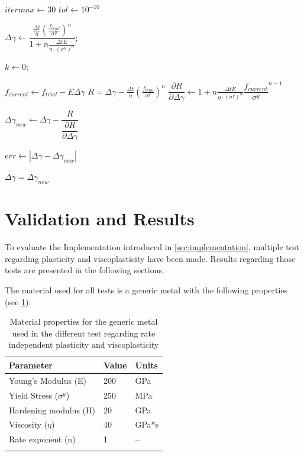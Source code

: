 \documentclass[final,5p,times,twocolumn]{elsarticle}
\begin{document}
\begin{algorithm}
  \KwOut{$\Delta \gamma$}

    $itermax \gets 30$\;
    $tol \gets 10^{-10}$\;

    $\Delta \gamma \gets \dfrac{\tfrac{\Delta t}{\eta}\left(\tfrac{f_{trial}}{\sigma^{y}}\right)^n}{1 + n \tfrac{\Delta t E}{\eta \cdot (\sigma^y)^n}}$;

    $k \gets 0$;

    {
      $f_{current} \gets f_{trial}-E\Delta \gamma$\;
      $R = \Delta \gamma - \tfrac{\Delta t}{\eta} \left(\tfrac{f_{trial}}{\sigma^{y}}\right) ^n $\;
      $\dfrac{\partial R}{\partial \Delta \gamma} \gets  1 + n \tfrac{\Delta t E}{\eta \cdot (\sigma^y)^n} \dfrac{f_{current}}{\sigma^{y}}^{n-1}$\;

      $\Delta \gamma_{new} \gets \Delta \gamma - \dfrac{R}{\dfrac{\partial R}{\partial \Delta \gamma}}$\;

      $err \gets |\Delta \gamma - \Delta \gamma_{new}|$\;

      $\Delta \gamma = \Delta \gamma_{new}$\;
    }

    

  
  \Return{$\Delta \gamma$}\;
  \caption{{$NonLinear\Delta\gamma$} Solve the plastic multiplier increment for the Perzyna-type viscoplastic model for the $n>1$ non-linear case using Newton-Raphson algorithm}
  \label{algo:nlgamma}
\end{algorithm}

\section{Validation and Results}
\label{sec:validation}
To evaluate the Implementation introduced in \cref{sec:implementation}, multiple test regarding plasticity and viscoplasticity have been made. Results regarding those tests are presented in the following sections.

The material used for all tests is a generic metal with the following properties (see \cref{table:matprop}):

\begin{table}[H]
\centering
\caption{Material properties for the generic metal used in the different test regarding rate independent plasticity and viscoplasticity}
\begin{tabular}{ l l l }
\hline
\textbf{Parameter}        & \textbf{Value} & \textbf{Units} \\
\hline 
Young's Modulus (E)       & 200            & GPa            \\ 
Yield Stress ($\sigma^y$) & 250            & MPa            \\ 
Hardening modulus (H)     & 20             & GPa            \\ 
Viscosity ($\eta$)        & 40             & GPa*s          \\ 
Rate exponent (n)         & 1              & --             \\
\hline
\label{table:matprop} 
\end{tabular}
\end{table}
\end{document}
